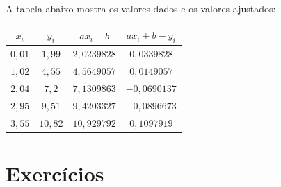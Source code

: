 \begin{sol}
A tabela abaixo mostra os valores dados e os valores ajustados:
\begin{center}
\begin{tabular}{|c|c|c|c|}
\hline
$x_i$ & $y_i$& $ax_i+b$& $ax_i+b-y_i$\\
\hline
$0,01$ & $1,99$ & $2,0239828$ & $0,0339828$\\
$1,02$ & $4,55$ & $4,5649057$ & $0,0149057$ \\
$2,04$ & $7,2$ & $7,1309863$ & $-0,0690137$ \\
$2,95$ & $9,51$ & $9,4203327$ & $-0,0896673$  \\
$3,55$ & $10,82$ & $10,929792$ & $0,1097919$ \\
\hline
\end{tabular}  
\end{center}
\end{sol}

\section*{Exercícios}

